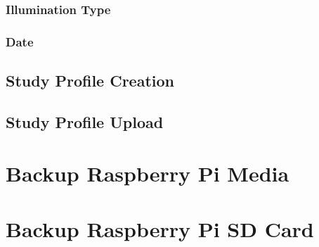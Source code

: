 \documentclass[12pt]{article}
\begin{document}
\subsubsection{Illumination Type}
\subsubsection{Date}
\subsection{Study Profile Creation}
\subsection{Study Profile Upload}
\section{Backup Raspberry Pi Media}
\section{Backup Raspberry Pi SD Card}
\end{document}
